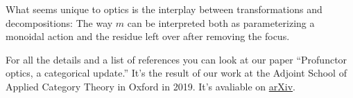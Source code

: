 \documentclass[11pt]{amsart}
\begin{document}
What seems unique to optics is the interplay between transformations and decompositions: The way $m$ can be interpreted both as parameterizing a monoidal action and the residue left over after removing the focus.

For all the details and a list of references you can look at our paper ``Profunctor optics, a categorical update.'' It's the result of our work at the Adjoint School of Applied Category Theory in Oxford in 2019. It's avaliable on \href{https://arxiv.org/abs/2001.07488}{arXiv}.
\end{document}
